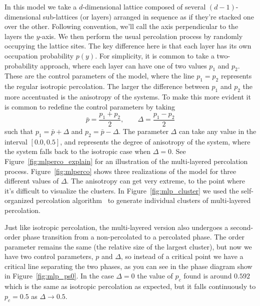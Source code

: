 In this model we take a $d$-dimensional lattice composed of several
$(d-1)$-dimensional sub-lattices (or layers) arranged in sequence as if they're
stacked one over the other. Following convention, we'll call the axis
perpendicular to the layers the $y$-axis. We then perform the usual percolation
process by randomly occupying the lattice sites. The key difference here is
that each layer has its own occupation probability $p(y)$. For simplicity, it
is common to take a two-probability approach, where each layer can have one of
two values $p_1$ and $p_2$. These are the control parameters of the model,
where the line $p_1=p_2$ represents the regular isotropic percolation. The
larger the difference between $p_1$ and $p_2$ the more accentuated is the
anisotropy of the systems. To make this more evident it is common to redefine
the control parameters by taking
\begin{equation}
    \bar{p}=\frac{p_1 + p_2}{2},\;\;\;\;\;\;\;\Delta=\frac{p_1 - p_2}{2}
\end{equation}
such that $p_1 = \bar{p} + \Delta$ and $p_2 = \bar{p} - \Delta$. The parameter
$\Delta$ can take any value in the interval $[0.0,0.5]$, and represents the
degree of anisotropy of the system, where the system falls back to the
isotropic case when $\Delta=0$. See Figure~\ref{fig:mlperco_explain} for an
illustration of the multi-layered percolation process. Figure~\ref{fig:mlperco}
shows three realizations of the model for three different values of $\Delta$.
The anisotropy can get very extreme, to the point where it's difficult to
visualize the clusters. In Figure~\ref{fig:mlp_cluster} we used the
self-organized percolation algorithm~\cite{Parteli2010} to generate individual
clusters of multi-layered percolation.

Just like isotropic percolation, the multi-layered version also undergoes a
second-order phase transition from a non-percolated to a percolated phase. The
order parameter  remains the same (the relative size of the largest cluster),
but now we have two control parameters, $p$ and $\Delta$, so instead of a
critical point we have a critical line separating the two phases, as you can
see in the phase diagram show in Figure~\ref{fig:mlp_ps0}. In the case
$\Delta=0$ the value of $p_c$ found is around $0.592$ which is the same as
isotropic percolation as expected, but it falls continuously to $p_c=0.5$ as
$\Delta\rightarrow 0.5$.

